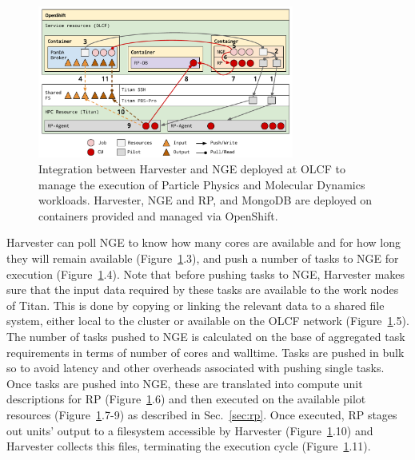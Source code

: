 \documentclass{webofc}
\begin{document}
\begin{figure}
  \centering
  \includegraphics[width=0.75\textwidth]{figures/integration.pdf}
  \caption{Integration between Harvester and NGE deployed at OLCF to manage
           the execution of Particle Physics and Molecular Dynamics
           workloads. Harvester, NGE and RP, and MongoDB are deployed on
           containers provided and managed via
           OpenShift.}\label{fig:integration}
\end{figure}

Harvester can poll NGE to know how many cores are available and for how long
they will remain available (Figure~\ref{fig:integration}.3), and push a
number of tasks to NGE for execution (Figure~\ref{fig:integration}.4). Note
that before pushing tasks to NGE, Harvester makes sure that the input data
required by these tasks are available to the work nodes of Titan. This is
done by copying or linking the relevant data to a shared file system, either
local to the cluster or available on the OLCF network
(Figure~\ref{fig:integration}.5). The number of tasks pushed to NGE is
calculated on the base of aggregated task requirements in terms of number of
cores and walltime. Tasks are pushed in bulk so to avoid latency and other
overheads associated with pushing single tasks. Once tasks are pushed into
NGE, these are translated into compute unit descriptions for RP
(Figure~\ref{fig:integration}.6) and then executed on the available pilot
resources (Figure~\ref{fig:integration}.7-9) as described in
Sec.~\ref{sec:rp}. Once executed, RP stages out units' output to a filesystem
accessible by Harvester (Figure~\ref{fig:integration}.10) and Harvester
collects this files, terminating the execution cycle
(Figure~\ref{fig:integration}.11).
\end{document}
